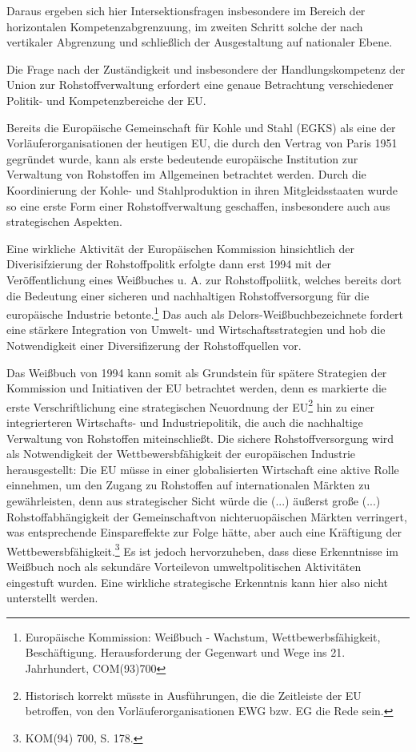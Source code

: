 \documentclass[12pt,a4paper,oneside]{book} %
\begin{document}
	Daraus ergeben sich hier Intersektionsfragen insbesondere im Bereich der horizontalen Kompetenzabgrenzuung, im zweiten Schritt solche der nach vertikaler Abgrenzung und schließlich der Ausgestaltung auf nationaler Ebene.
	
	Die Frage nach der Zuständigkeit und insbesondere der Handlungskompetenz der Union zur Rohstoffverwaltung erfordert eine genaue Betrachtung verschiedener Politik- und Kompetenzbereiche der EU.
	
	Bereits die Europäische Gemeinschaft für Kohle und Stahl (EGKS) als eine der Vorläuferorganisationen der heutigen EU, die durch den Vertrag von Paris 1951 gegründet wurde, kann als erste bedeutende europäische Institution zur Verwaltung von Rohstoffen im Allgemeinen betrachtet werden. Durch die Koordinierung der Kohle- und Stahlproduktion in ihren Mitgleidsstaaten wurde so eine erste Form einer Rohstoffverwaltung geschaffen, insbesondere auch aus strategischen Aspekten.%
	
	Eine wirkliche Aktivität der Europäischen Kommission hinsichtlich der Diverisifzierung der Rohstoffpolitk erfolgte dann erst 1994 mit der Veröffentlichung eines Weißbuches u. A. zur Rohstoffpoliitk, welches bereits dort die Bedeutung einer sicheren und nachhaltigen Rohstoffversorgung für die europäische Industrie betonte.\footnote{Europäische Kommission: Weißbuch - Wachstum, Wettbewerbsfähigkeit, Beschäftigung. Herausforderung der Gegenwart und Wege ins 21. Jahrhundert, COM(93)700}
	Das auch als \glqq Delors-Weißbuch\grqq bezeichnete  fordert eine stärkere Integration von Umwelt- und Wirtschaftsstrategien und hob die Notwendigkeit einer Diversifizerung der Rohstoffquellen vor.
	
	
	Das Weißbuch von 1994 kann somit als Grundstein für spätere Strategien der Kommission und Initiativen der EU betrachtet werden, denn es markierte die erste Verschriftlichung eine strategischen Neuordnung der EU\footnote{Historisch korrekt müsste in Ausführungen, die die Zeitleiste der EU betroffen, von den Vorläuferorganisationen EWG bzw. EG die Rede sein.} hin zu einer integrierteren Wirtschafts- und Industriepolitik, die auch die nachhaltige Verwaltung von Rohstoffen miteinschließt. Die sichere Rohstoffversorgung wird als Notwendigkeit der Wettbewersbfähigkeit der europäischen Industrie herausgestellt: Die EU müsse in einer globalisierten Wirtschaft eine aktive Rolle einnehmen, um den Zugang zu  Rohstoffen auf internationalen Märkten zu gewährleisten, denn aus strategischer Sicht würde die \glqq (...) äußerst große (...) Rohstoffabhängigkeit der Gemeinschaft\grqq von nichteruopäischen Märkten verringert, was entsprechende Einspareffekte zur Folge hätte, aber auch eine Kräftigung der Wettbewersbfähigkeit.\footnote{KOM(94) 700, S. 178.} Es ist jedoch hervorzuheben, dass diese Erkenntnisse im Weißbuch noch als \glqq sekundäre Vorteile\grqq von umweltpolitischen Aktivitäten eingestuft wurden. Eine wirkliche strategische Erkenntnis kann hier also nicht unterstellt werden.
	
\end{document}
